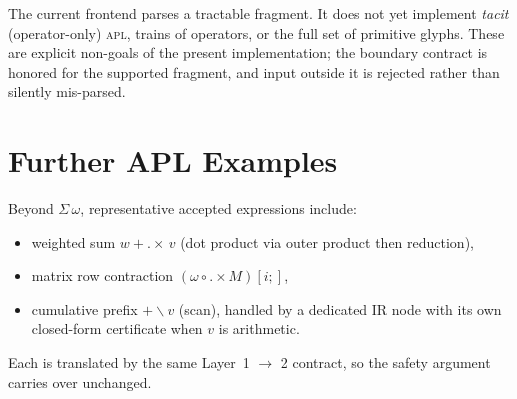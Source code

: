The current frontend parses a tractable fragment. It does not yet implement
\emph{tacit} (operator-only) \textsc{apl}, trains of operators, or the full
set of primitive glyphs. These are explicit non-goals of the present
implementation; the boundary contract is honored for the supported fragment,
and input outside it is rejected rather than silently mis-parsed.

\section{Further APL Examples}
\label{sec:apl-further}

Beyond $\Sigma\,\omega$, representative accepted expressions include:
\begin{itemize}
  \item weighted sum $w+. \times\, v$ (dot product via outer product then
        reduction),
  \item matrix row contraction $(\omega \circ.\times M)[i;]$,
  \item cumulative prefix $+\backslash v$ (scan), handled by a dedicated
        IR node with its own closed-form certificate when $v$ is
        arithmetic.
\end{itemize}
Each is translated by the same Layer~1 $\to$ 2 contract, so the safety
argument carries over unchanged.
